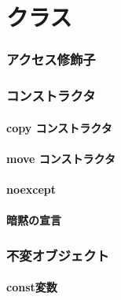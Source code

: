 
\part{クラス}

\section{アクセス修飾子}


\section{コンストラクタ}

\subsection{copy コンストラクタ}


\subsection{move コンストラクタ}


\subsection{noexcept}

\subsection{暗黙の宣言}

\section{不変オブジェクト}
\subsection{const変数}


